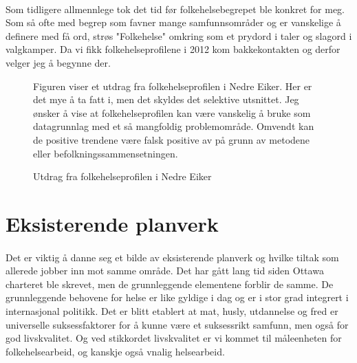 \documentclass[11pt]{memoir} %
\begin{document}
		\paragraph{}
			Som tidligere allmennlege tok det tid før folkehelsebegrepet ble konkret for meg. Som så ofte med begrep som favner mange samfunnsområder og er vanskelige å definere med få ord, strøs "Folkehelse" omkring som et prydord i taler og slagord i valgkamper. Da vi fikk folkehelseprofilene i 2012 kom bakkekontakten og derfor velger jeg å begynne der.  

                    \begin{figure}[ht]
                      \centering
                      \captionsetup{singlelinecheck=off}
                      \caption{Utdrag fra folkehelseprofilen i Nedre Eiker}
                      {Figuren viser et utdrag fra folkehelseprofilen i Nedre Eiker. Her er det mye å ta fatt i, men det skyldes det selektive utsnittet. Jeg ønsker å vise at folkehelseprofilen kan være vanskelig å bruke som datagrunnlag med et så mangfoldig problemområde. Omvendt kan de positive trendene være falsk positive av på grunn av metodene eller befolkningssammensetningen.\cite{fhprofil}}\label{fhprofilnekbilde}%
                    \end{figure}    

		
	\section{Eksisterende planverk}
		\paragraph{}
			Det er viktig å danne seg et bilde av eksisterende planverk og hvilke tiltak som allerede jobber inn mot samme område. Det har gått lang tid siden Ottawa charteret\cite{ottawa} ble skrevet, men de grunnleggende elementene forblir de samme. De grunnleggende behovene for helse er like gyldige i dag og er i stor grad integrert i internasjonal politikk. Det er blitt etablert at mat, husly, utdannelse og fred er universelle suksessfaktorer for å kunne være et suksessrikt samfunn, men også for god livskvalitet. Og ved stikkordet livskvalitet er vi kommet til måleenheten for folkehelsearbeid, og kanskje også vnalig helsearbeid.\\
\end{document}
